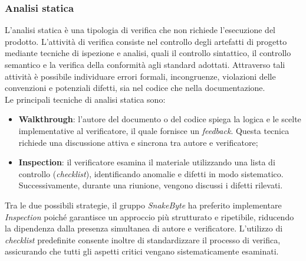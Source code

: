 \documentclass[10pt, letterpaper]{article}
\begin{document}
\subsubsection{Analisi statica}
L'analisi statica è una tipologia di verifica che non richiede l'esecuzione del prodotto.
L'attività di verifica consiste nel controllo degli artefatti di progetto mediante
tecniche di ispezione e analisi, quali il controllo sintattico, il controllo semantico
e la verifica della conformità agli standard adottati. Attraverso tali attività è
possibile individuare errori formali, incongruenze, violazioni delle convenzioni e
potenziali difetti, sia nel codice che nella documentazione.
\\Le principali tecniche di analisi statica sono:
\begin{itemize}
    \item \textbf{Walkthrough}: l'autore del documento o del codice spiega la logica e le
          scelte implementative al verificatore, il quale fornisce un \textit{feedback}.
          Questa tecnica richiede una discussione attiva e sincrona tra autore e verificatore;
    \item \textbf{Inspection}: il verificatore esamina il materiale utilizzando una lista di controllo (\textit{checklist}),
          identificando anomalie e difetti in modo sistematico. Successivamente, durante una riunione, vengono discussi i
          difetti rilevati.
\end{itemize}
Tra le due possibili strategie, il gruppo \textit{SnakeByte} ha preferito implementare \textit{Inspection} poiché
garantisce un approccio più strutturato e ripetibile, riducendo la dipendenza
dalla presenza simultanea di autore e verificatore. L'utilizzo di \textit{checklist}
predefinite consente inoltre di standardizzare il processo di verifica, assicurando
che tutti gli aspetti critici vengano sistematicamente esaminati.
\end{document}
